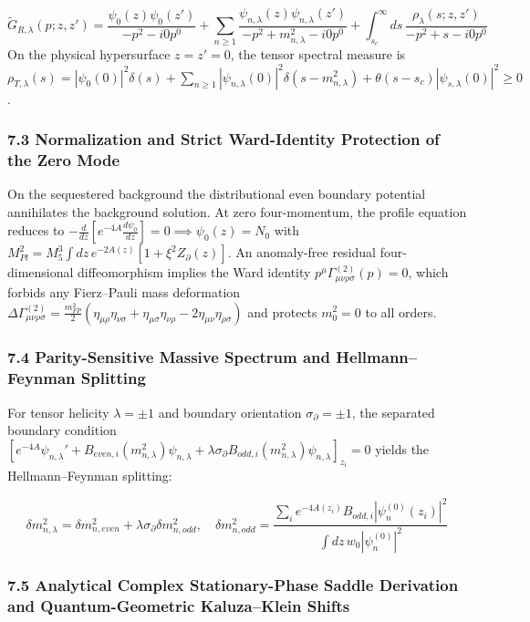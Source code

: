 \documentclass[aps,prd,onecolumn,superscriptaddress,nofootinbib,longbibliography,10pt]{revtex4-2}
\begin{document}
{{\[\tilde{G}_{R,\lambda}(p; z,z') = \frac{\psi_0(z)\psi_0(z')}{-p^2 - i0p^0} + \sum_{n\ge 1}\frac{\psi_{n,\lambda}(z)\psi_{n,\lambda}(z')}{-p^2 + m_{n,\lambda}^2 - i0p^0} + \int_{s_c}^\infty ds\,\frac{\rho_\lambda(s; z,z')}{-p^2 + s - i0p^0}\]
On the physical hypersurface \(z = z' = 0\), the tensor spectral measure is \(\rho_{T,\lambda}(s) = |\psi_0(0)|^2\delta(s) + \sum_{n\ge 1}|\psi_{n,\lambda}(0)|^2\delta(s - m_{n,\lambda}^2) + \theta(s - s_c)|\psi_{s,\lambda}(0)|^2 \ge 0\).




\subsubsection*{7.3 Normalization and Strict Ward-Identity Protection of the Zero Mode}

On the sequestered background the distributional even boundary potential annihilates the background solution. At zero four-momentum, the profile equation reduces to \(-\frac{d}{dz}[e^{-4A}\frac{d\psi_0}{dz}] = 0 \implies \psi_0(z) = N_0\) with \(M_{Pl}^2 = M_5^3 \int dz\,e^{-2A(z)}[1 + \xi^2 Z_\partial(z)]\). An anomaly-free residual four-dimensional diffeomorphism implies the Ward identity \(p^\mu \Gamma_{\mu\nu\rho\sigma}^{(2)}(p) = 0\), which forbids any Fierz--Pauli mass deformation \(\Delta\Gamma_{\mu\nu\rho\sigma}^{(2)} = \frac{m_{FP}^2}{2}(\eta_{\mu\rho}\eta_{\nu\sigma} + \eta_{\mu\sigma}\eta_{\nu\rho} - 2\eta_{\mu\nu}\eta_{\rho\sigma})\) and protects \(m_0^2 = 0\) to all orders.




\subsubsection*{7.4 Parity-Sensitive Massive Spectrum and Hellmann--Feynman Splitting}

For tensor helicity \(\lambda = \pm 1\) and boundary orientation \(\sigma_\partial = \pm 1\), the separated boundary condition \(\left[ e^{-4A}\psi_{n,\lambda}' + B_{even,i}(m_{n,\lambda}^2)\psi_{n,\lambda} + \lambda\sigma_\partial B_{odd,i}(m_{n,\lambda}^2)\psi_{n,\lambda} \right]_{z_i} = 0\) yields the Hellmann--Feynman splitting:


\[\delta m_{n,\lambda}^2 = \delta m_{n,even}^2 + \lambda\sigma_\partial \delta m_{n,odd}^2, \quad \delta m_{n,odd}^2 = \frac{\sum_i e^{-4A(z_i)} B_{odd,i} |\psi_n^{(0)}(z_i)|^2}{\int dz\,w_0 |\psi_n^{(0)}|^2}\]


\subsubsection*{7.5 Analytical Complex Stationary-Phase Saddle Derivation and Quantum-Geometric Kaluza--Klein Shifts}

}}
\end{document}
